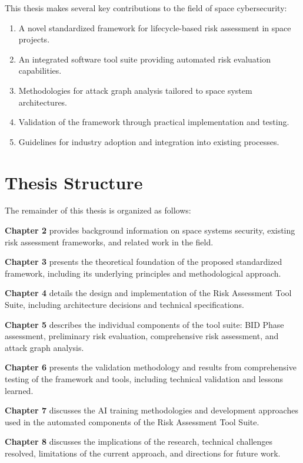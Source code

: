 \documentclass[binding=0.6cm]{sapthesis}
\begin{document}
This thesis makes several key contributions to the field of space cybersecurity:

\begin{enumerate}
    \item A novel standardized framework for lifecycle-based risk assessment in space projects.
    \item An integrated software tool suite providing automated risk evaluation capabilities.
    \item Methodologies for attack graph analysis tailored to space system architectures.
    \item Validation of the framework through practical implementation and testing.
    \item Guidelines for industry adoption and integration into existing processes.
\end{enumerate}

\section{Thesis Structure}

The remainder of this thesis is organized as follows:

\textbf{Chapter 2} provides background information on space systems security, existing risk assessment frameworks, and related work in the field.

\textbf{Chapter 3} presents the theoretical foundation of the proposed standardized framework, including its underlying principles and methodological approach.

\textbf{Chapter 4} details the design and implementation of the Risk Assessment Tool Suite, including architecture decisions and technical specifications.

\textbf{Chapter 5} describes the individual components of the tool suite: BID Phase assessment, preliminary risk evaluation, comprehensive risk assessment, and attack graph analysis.

\textbf{Chapter 6} presents the validation methodology and results from comprehensive testing of the framework and tools, including technical validation and lessons learned.

\textbf{Chapter 7} discusses the AI training methodologies and development approaches used in the automated components of the Risk Assessment Tool Suite.

\textbf{Chapter 8} discusses the implications of the research, technical challenges resolved, limitations of the current approach, and directions for future work.
\end{document}
